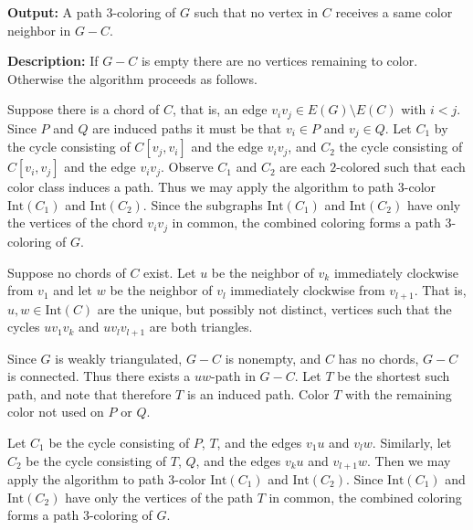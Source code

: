 \documentclass[letterpaper, 12pt]{amsart}
\theoremstyle{definition}
\theoremstyle{definition}
\theoremstyle{thm}
\theoremstyle{definition}
\begin{document}
\noindent\textbf{Output:} A path $3$-coloring of $G$ such that no vertex in
$C$ receives a same color neighbor in $G-C$.

\noindent\textbf{Description:} If $G-C$ is empty there are no vertices remaining
to color. Otherwise the algorithm proceeds as follows.

Suppose there is a chord of $C$, that is, an edge $v_iv_j\in E(G)\setminus E(C)$
with $i<j$. Since $P$ and $Q$ are induced paths it must be that $v_i\in P$ and
$v_j\in Q$. Let $C_1$ by the cycle consisting of $C[v_j,v_i]$ and the
edge $v_iv_j$, and $C_2$ the cycle consisting of $C[v_i,v_j]$ and the edge
$v_iv_j$. Observe $C_1$ and $C_2$ are each $2$-colored
such that each color class induces a path. Thus we may apply the algorithm to
path $3$-color $\text{Int}(C_1)$ and $\text{Int}(C_2)$. Since the subgraphs
$\text{Int}(C_1)$ and $\text{Int}(C_2)$ have only the vertices of the chord
$v_iv_j$ in common, the combined coloring forms a path $3$-coloring of $G$.

Suppose no chords of $C$ exist. Let $u$ be the neighbor of $v_k$ immediately
clockwise from $v_1$ and let $w$ be the neighbor of $v_l$ immediately clockwise
from $v_{l+1}$. That is, $u,w\in\text{Int}(C)$ are the unique, but possibly not
distinct, vertices such that
the cycles $uv_1v_k$ and $uv_lv_{l+1}$ are both triangles.

Since $G$ is weakly triangulated, $G-C$ is nonempty,
and $C$ has no chords, $G-C$ is connected. Thus there exists a $uw$-path in
$G-C$. Let $T$ be the shortest such path, and note that therefore $T$ is
an induced path. Color $T$ with the remaining color not used on $P$ or $Q$.

Let $C_1$ be the cycle
consisting of $P$, $T$, and the edges $v_1u$ and $v_lw$. Similarly, let $C_2$ be
the cycle consisting of $T$, $Q$, and the edges $v_ku$ and $v_{l+1}w$. Then we
may apply the algorithm to path $3$-color $\text{Int}(C_1)$ and
$\text{Int}(C_2)$. Since $\text{Int}(C_1)$ and $\text{Int}(C_2)$ have only the
vertices of the path $T$ in common, the combined coloring forms a path
$3$-coloring of $G$.\\
\end{document}
